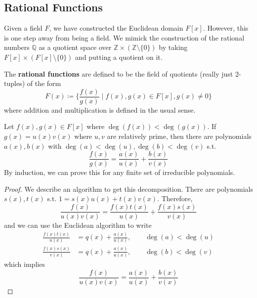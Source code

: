 \subsection{Rational Functions}

  Given a field $F$, we have constructed the Euclidean domain $F[x]$. However, this is one step away from being a field. We mimick the construction of the rational numbers $\mathbb{Q}$ as a quotient space over $\mathbb{Z} \times (\mathbb{Z} \setminus \{0\})$ by taking $F[x] \times (F[x] \setminus \{0\})$ and putting a quotient on it. 
  
  \begin{definition}
    The \textbf{rational functions} are defined to be the field of quotients (really just 2-tuples) of the form 
    \begin{equation}
      F(x) \coloneqq \bigg\{ \frac{f(x)}{g(x)} \; \bigg| \; f(x), g(x) \in F[x], g(x) \neq 0 \bigg\}
    \end{equation}
    where addition and multiplication is defined in the usual sense.
  \end{definition}

  \begin{theorem}
    Let $f(x), g(x) \in F[x]$ where $\deg(f(x)) < \deg(g(x))$. If $g(x) = u(x) v(x)$ where $u, v$ are relatively prime, then there are polynomials $a(x), b(x)$ with $\deg(a) < \deg(u), \deg(b) < \deg(v)$ s.t. 
    \begin{equation}
      \frac{f(x)}{g(x)} = \frac{a(x)}{u(x)} + \frac{b(x)}{v(x)}
    \end{equation}
    By induction, we can prove this for any finite set of irreducible polynomials. 
  \end{theorem}
  \begin{proof}
    We describe an algorithm to get this decomposition. There are polynomials $s(x), t(x)$ s.t. $1 = s(x) u(x) + t(x) v(x)$. Therefore, 
    \begin{equation}
      \frac{f(x)}{ u(x) v(x)} = \frac{f(x) t(x)}{u(x)} + \frac{f(x) s(x)}{v(x)}
    \end{equation}
    and we can use the Euclidean algorithm to write 
    \begin{align}
      \frac{f(x) t(x)}{u(x)} & = q(x) + \frac{a(x)}{u(x)}, \qquad \deg(a) < \deg(u) \\
      \frac{f(x) s(x)}{v(x)} & = q(x) + \frac{a(x)}{u(x)}, \qquad \deg(b) < \deg(v)
    \end{align}
    which implies 
    \begin{equation}
      \frac{f(x)}{u(x) v(x)} = \frac{a(x)}{u(x)} + \frac{b(x)}{v(x)}
    \end{equation}
  \end{proof}

